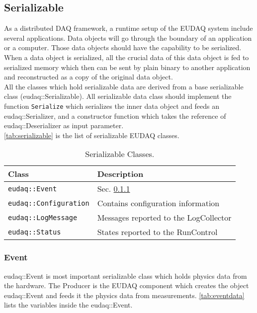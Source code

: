 \subsection{Serializable}
As a distributed DAQ framework, a runtime setup of the EUDAQ system include several applications. Data objects will go through the boundary of an application or a computer. Those data objects should have the capability to be serialized. When a data object is serialized, all the crucial data of this data object is fed to serialized memory which then can be sent by plain binary to another application and reconstructed as a copy of the original data object. \\

All the classes which hold serializable data are derived from a base serializable class (eudaq::Serializable). All serializable data class
should implement the function \texttt{Serialize} which serializes the inner data object and feeds an eudaq::Serializer, and a constructor function which takes the reference of eudaq::Deserializer as input parameter.\\

\autoref{tab:serializable} is the list of serializable EUDAQ classes.

\begin{table}
\centering
\small
\begin{tabular}{ l | l }
  \textbf{Class} & \textbf{Description}\\
  \hline
  \texttt{eudaq::Event} & Sec. \ref{sec:Event} \\
  \texttt{eudaq::Configuration} & Contains configuration information \\
  \texttt{eudaq::LogMessage} & Messages reported to the LogCollector \\
  \texttt{eudaq::Status} & States reported to the RunControl \\
\end{tabular}
\caption{Serializable Classes.}
\label{tab:serializable}
\end{table}

\subsubsection{Event}\label{sec:Event}
eudaq::Event is most important serializable class which holds physics data from the hardware. The Producer is the EUDAQ component which creates the object eudaq::Event and feeds it the physics data from measurements.  \autoref{tab:eventdata} lists the variables inside the eudaq::Event. \\


